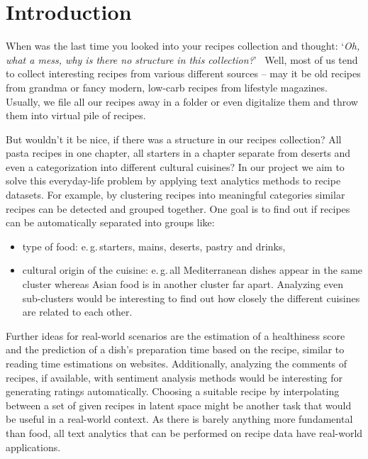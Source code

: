 \documentclass[
     12pt,         %
     a4paper,      %
     BCOR10mm,     %
     DIV14,        %
     ]{article}
\begin{document}

\section{Introduction}

When was the last time you looked into your recipes collection and thought: \textquoteleft\emph{Oh, what a mess, why is there no structure in this collection?}\textquoteright~ Well, most of us tend to collect interesting recipes from various different sources -- may it be old recipes from grandma or fancy modern, low-carb recipes from lifestyle magazines. Usually, we file all our recipes away in a folder or even digitalize them and throw them into virtual pile of recipes.

But wouldn't it be nice, if there was a structure in our recipes collection? All pasta recipes in one chapter, all starters in a chapter separate from deserts and even a categorization into different cultural cuisines? In our project we aim to solve this everyday-life problem by applying text analytics methods to recipe datasets. For example, by clustering recipes into meaningful categories similar recipes can be detected and grouped together. One goal is to find out if recipes can be automatically separated into groups like:
\begin{itemize}
  \item type of food: e.\,g.\,starters, mains, deserts, pastry and drinks,
  \item cultural origin of the cuisine: e.\,g.\,all Mediterranean dishes appear in the same cluster whereas Asian food is in another cluster far apart. Analyzing even sub-clusters would be interesting to find out how closely the different cuisines are related to each other.
\end{itemize}

Further ideas for real-world scenarios are the estimation of a healthiness score and the prediction of a dish's preparation time based on the recipe, similar to reading time estimations on websites. Additionally, analyzing the comments of recipes, if available, with sentiment analysis methods would be interesting for generating ratings automatically. Choosing a suitable recipe by interpolating between a set of given recipes in latent space might be another task that would be useful in a real-world context. As there is barely anything more fundamental than food, all text analytics that can be performed on recipe data have real-world applications.
\end{document}
